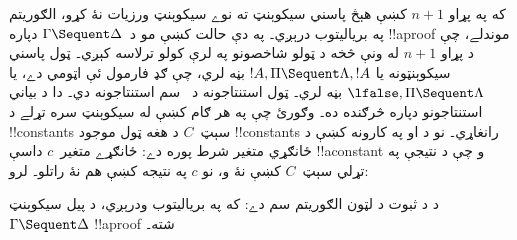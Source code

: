 \documentclass[../../../include/open-logic-section]{subfiles}
\begin{document}
که په پړاو $n+1$ کښې هېڅ پاسني سيکوېنټ ته نوے
سيکوېنټ ورزيات نۀ کړو، الګوريتم په برياليتوب درېږي۔ په دې
حالت کښې مو د~$\Gamma \Sequent \Delta$ دپاره !!a{proof}
موندلے، چې د پړاو $n+1$ له ونې څخه د ټولو شاخصونو په لرې
کولو ترلاسه کېږي۔ ټول پاسني سيکوېنټونه يا
$!A, \Pi \Sequent \Lambda, !A$ بڼه لري، چې ګډ فارمول ئې
اټومي دے، يا $\lfalse, \Pi \Sequent \Lambda$ بڼه لري۔ ټول
استنتاجونه د~ سم استنتاجونه دي۔ دا د بياني
استنتاجونو دپاره څرګنده ده۔ وګورئ چې په هر ګام کښې له
سيکوېنټ سره تړلے د !!{constant}s سېټ~$C$ د هغه ټول موجود
!!{constant}s رانغاړي۔ نو د \LeftR{\lexists} او
\RightR{\lforall} په کارونه کښې د ځانګړي متغير شرط پوره
دے: ځانګړے متغير~$c$ داسې !!a{constant} و چې د نتيجې په
تړلي سېټ~$C$ کښې نۀ و، نو $c$ په نتيجه کښې هم نۀ راتلو۔ لرو:

\begin{prop}
د  د ثبوت د لټون الګوريتم سم دے: که په برياليتوب
ودرېږي، د پيل سيکوېنټ~$\Gamma \Sequent \Delta$
!!a{proof} شته۔
\end{prop}
\end{document}
